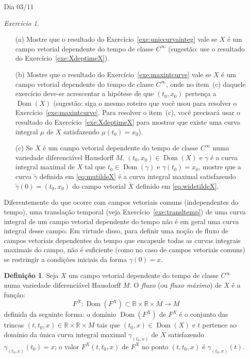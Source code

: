 \documentclass[oneside,11pt]{amsart}
\newcommand{\R}{\mathds R}
\DeclareMathOperator{\Dom}{Dom}
\theoremstyle{remark}\newtheorem{exercise}{Exercício}[section]
\theoremstyle{plain}\newtheorem{teo}{Teorema}[section]
\theoremstyle{plain}\newtheorem{lem}[teo]{Lema}
\theoremstyle{plain}\newtheorem{prop}[teo]{Proposição}
\theoremstyle{definition}\newtheorem{defin}[teo]{Definição}
\theoremstyle{remark}\newtheorem{rem}[teo]{Observação}
\theoremstyle{definition}\newtheorem{example}[teo]{Exemplo}
\numberwithin{equation}{section}
\begin{document}
\begin{section}{Dia 03/11}
\begin{exercise}\label{exe:maxintcurvetime}\
\begin{itemize}
\item[(a)] Mostre que o resultado do Exercício~\ref{exe:uniccurvainteg} vale se $X$ é um campo vetorial dependente do tempo de classe $C^\infty$ (sugestão:
use o resultado do Exercício~\ref{exe:XdeptimeX}).
\item[(b)] Mostre que o resultado do Exercício~\ref{exe:maxintcurve} vale se $X$ é um campo vetorial dependente do tempo de classe $C^\infty$,
onde no item~(c) daquele exercício deve-se acrescentar a hipótese de que $(t_0,x_0)$ pertença a $\Dom(X)$ (sugestão: siga o mesmo roteiro que você
usou para resolver o Exercício~\ref{exe:maxintcurve}. Para resolver o item~(c), você precisará usar o resultado do
Exercício~\ref{exe:XdeptimeX} para mostrar que existe uma curva integral $\mu$ de $X$ satisfazendo $\mu(t_0)=x_0$).
\item[(c)] Se $X$ é um campo vetorial dependente do tempo de classe $C^\infty$ numa variedade diferenciável Hausdorff $M$, $(t_0,x_0)\in\Dom(X)$
e $\gamma$ é a curva integral maximal de $X$ tal que $t_0\in\Dom(\gamma)$ e $\gamma(t_0)=x_0$, mostre que a curva $\tilde\gamma$
definida em \eqref{eq:mutildeX} é a curva integral maximal satisfazendo $\tilde\gamma(0)=(t_0,x_0)$ do campo vetorial $\widetilde X$ definido em
\eqref{eq:widetildeX}.
\end{itemize}
\end{exercise}

Diferentemente do que ocorre com campos vetoriais comuns (independentes do tempo), uma translação temporal (veja Exercício~\ref{exe:transltemp})
de uma curva integral de um campo vetorial dependente do tempo não é em geral uma curva integral desse campo. Em virtude disso, para definir
uma noção de fluxo de campos vetoriais dependentes do tempo que encapsule todas as curvas integrais maximais do campo, não é suficiente (como no
caso de campos vetoriais comuns) se restringir a condições iniciais da forma $\gamma(0)=x$.
\begin{defin}
Seja $X$ um campo vetorial dependente do tempo de classe $C^\infty$ numa variedade diferenciável Hausdorff $M$. O {\em fluxo\/} (ou {\em fluxo máximo}) de
$X$ é a função:
\[F^X:\Dom(F^X)\subset\R\times\R\times M\longrightarrow M\]
definida da seguinte forma: o domínio $\Dom(F^X)$ de $F^X$ é o conjunto das trincas $(t,t_0,x)\in\R\times\R\times M$ tais que $(t_0,x)\in\Dom(X)$
e $t$ pertence ao domínio da única curva integral maximal $\gamma_{(t_0,x)}$ de $X$ satisfazendo $\gamma_{(t_0,x)}(t_0)=x$; o valor $F^X(t,t_0,x)$ de $F^X$ no
ponto $(t,t_0,x)$ é $\gamma_{(t_0,x)}(t)$.
\end{defin}


\end{section}
\end{document}
